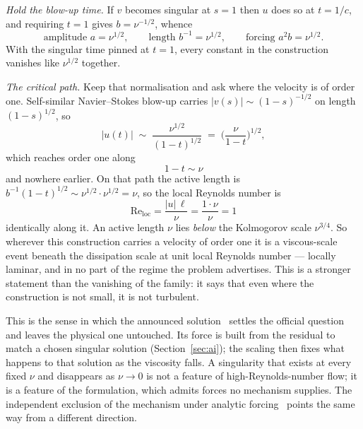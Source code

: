 \documentclass[11pt]{article}
\begin{document}
\emph{Hold the blow-up time.} If $v$ becomes singular at $s=1$ then $u$ does so at $t=1/c$, and
requiring $t=1$ gives $b=\nu^{-1/2}$, whence
\begin{equation}\label{eq:halfpower}
\text{amplitude } a=\nu^{1/2},\qquad
\text{length } b^{-1}=\nu^{1/2},\qquad
\text{forcing } a^2b=\nu^{1/2}.
\end{equation}
With the singular time pinned at $t=1$, every constant in the construction vanishes like
$\nu^{1/2}$ together.

\emph{The critical path.} Keep that normalisation and ask where the velocity is of order one.
Self-similar Navier--Stokes blow-up carries $|v(s)|\sim(1-s)^{-1/2}$ on length $(1-s)^{1/2}$, so
\begin{equation}\label{eq:path}
|u(t)|\;\sim\;\frac{\nu^{1/2}}{(1-t)^{1/2}}\;=\;\Big(\frac{\nu}{1-t}\Big)^{1/2},
\end{equation}
which reaches order one along
\begin{equation}\label{eq:critpath}
1-t\sim\nu
\end{equation}
and nowhere earlier. On that path the active length is $b^{-1}(1-t)^{1/2}\sim
\nu^{1/2}\cdot\nu^{1/2}=\nu$, so the local Reynolds number is
\begin{equation}\label{eq:reloc}
\mathrm{Re}_{\mathrm{loc}}=\frac{|u|\,\ell}{\nu}=\frac{1\cdot\nu}{\nu}=1
\end{equation}
identically along it. An active length $\nu$ lies \emph{below} the Kolmogorov scale $\nu^{3/4}$.
So wherever this construction carries a velocity of order one it is a viscous-scale event beneath
the dissipation scale at unit local Reynolds number --- locally laminar, and in no part of the
regime the problem advertises. This is a stronger statement than the vanishing of the family: it
says that even where the construction is not small, it is not turbulent.

This is the sense in which the announced solution~\cite{openai} settles the official question and
leaves the physical one untouched. Its force is built from the residual to match a chosen singular
solution (Section~\ref{sec:ai}); the scaling then fixes what happens to that solution as the
viscosity falls. A singularity that exists at every fixed $\nu$ and disappears as $\nu\to0$ is not a
feature of high-Reynolds-number flow; it is a feature of the formulation, which admits forces no
mechanism supplies. The independent exclusion of the mechanism under analytic forcing~\cite{civ}
points the same way from a different direction.
\end{document}
